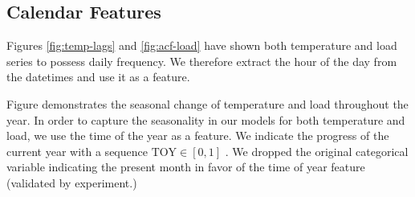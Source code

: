 \documentclass[conference]{IEEEtran}
\begin{document}
\subsection{Calendar Features}
\label{sec:calendar}
Figures \ref{fig:temp-lags} and \ref{fig:acf-load} have shown both temperature and load series to possess daily frequency. We therefore extract the hour of the day from the datetimes and use it as a feature. 

Figure \cite{fig:seasonality} demonstrates the seasonal change of temperature and load throughout the year. In order to capture the seasonality in our models for both temperature and load, we use the time of the year as a feature. We indicate the progress of the current year with a sequence $\text{TOY} \in [0,1]$ \cite{Fan2010}. We dropped the original categorical variable indicating the present month in favor of the time of year feature (validated by experiment.) 
\end{document}
